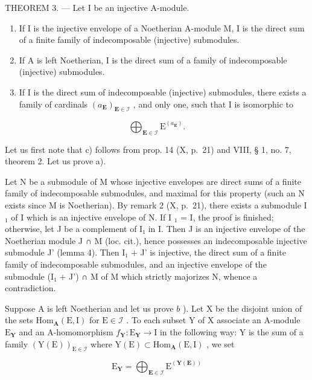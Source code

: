 THEOREM 3. --- Let I be an injective A-module.

\begin{enumerate}
\def\labelenumi{\alph{enumi})}
\item
  If I is the injective envelope of a Noetherian A-module M, I is the direct sum of a finite family of indecomposable (injective) submodules.
\item
  If A is left Noetherian, I is the direct sum of a family of indecomposable (injective) submodules.
\item
  If I is the direct sum of indecomposable (injective) submodules, there exists a family of cardinals \((a_{\mathbf{E}})_{\mathbf{E}\in\mathcal{I}}\) , and only one, such that I is isomorphic to
\end{enumerate}

\[
\bigoplus_ {\mathbf {E} \in \mathcal {I}} \mathrm{E} ^ {(a _ {\mathbf {E}})}.
\]

Let us first note that c) follows from prop. 14 (X, p.~21) and VIII, § 1, no. 7, theorem 2. Let us prove a).

Let N be a submodule of M whose injective envelopes are direct sums of a finite family of indecomposable submodules, and maximal for this property (such an N exists since M is Noetherian). By remark 2 (X, p.~21), there exists a submodule I \(_{1}\) of I which is an injective envelope of N. If I \(_{1}\) = I, the proof is finished; otherwise, let J be a complement of I₁ in I. Then J is an injective envelope of the Noetherian module J ∩ M (loc. cit.), hence possesses an indecomposable injective submodule J' (lemma 4). Then I₁ + J' is injective, the direct sum of a finite family of indecomposable submodules, and an injective envelope of the submodule (I₁ + J') ∩ M of M which strictly majorizes N, whence a contradiction.

Suppose A is left Noetherian and let us prove \(b\) ). Let X be the disjoint union of the sets \(\mathrm{Hom}_{\mathbf{A}}(\mathrm{E},\mathrm{I})\) for \(\mathrm{E}\in\mathcal{I}\) . To each subset Y of X associate an A-module \(\mathrm{E}_{\mathbf{Y}}\) and an A-homomorphism \(f_{\mathbf{Y}}:\mathrm{E}_{\mathbf{Y}}\to\mathrm{I}\) in the following way: Y is the sum of a family \((\mathrm{Y}(\mathrm{E}))_{\mathrm{E}\in\mathcal{I}}\) where \(\mathrm{Y}(\mathrm{E})\subset\mathrm{Hom}_{\mathbf{A}}(\mathrm{E},\mathrm{I})\) , we set

\[
\mathrm{E} _ {\mathbf {Y}} = \bigoplus_ {\mathbf {E} \in \mathcal {I}} \mathrm{E} ^ {(\mathbf {Y} (\mathbf {E}))}
\]

